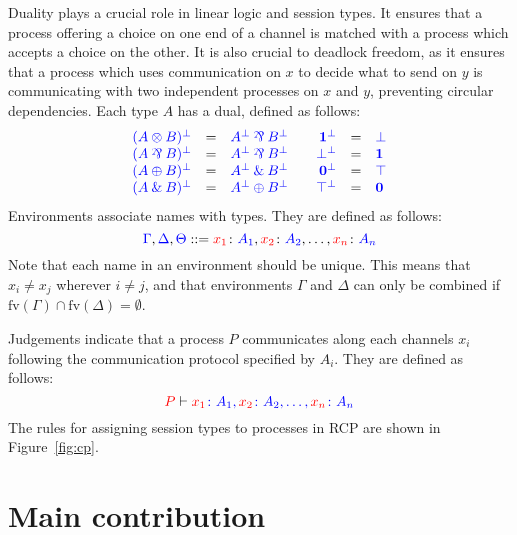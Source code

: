 \documentclass[a4paper,UKenglish]{lipics-v2016}
\begin{document}
Duality plays a crucial role in linear logic and session types. It ensures that
a process offering a choice on one end of a channel is matched with a process
which accepts a choice on the other. It is also crucial to deadlock freedom, as
it ensures that a process which uses communication on $x$ to decide what to send
on $y$ is communicating with two independent processes on $x$ and $y$,
preventing circular dependencies. Each type $A$ has a dual, defined as follows:
\[
  \begin{array}{rclcrcl}
    \tm{( A \tens B )^\bot} &=& \tm{A^\bot \parr B^\bot}&&
    \tm{\one^\bot}          &=& \tm{\bot}\\
    \tm{( A \parr B )^\bot} &=& \tm{A^\bot \parr B^\bot}&&
    \tm{\bot^\bot}          &=& \tm{\one}\\
    \tm{( A \plus B )^\bot} &=& \tm{A^\bot \with B^\bot}&&
    \tm{\nil^\bot}          &=& \tm{\top}\\
    \tm{( A \with B )^\bot} &=& \tm{A^\bot \plus B^\bot}&&
    \tm{\top^\bot}          &=& \tm{\nil}
  \end{array}
\]
Environments associate names with types. They are defined as follows:
\[
  \blue{\Gamma},\blue{\Delta},\blue{\Theta} ::=
  \tm[x_1]{A_1},\tm[x_2]{A_2},\dots,\tm[x_n]{A_n}
\]
Note that each name in an environment should be unique. This means that $x_i
\neq x_j$ wherever $i \neq j$, and that environments $\Gamma$ and $\Delta$ can
only be combined if $\text{fv}(\Gamma) \cap \text{fv}(\Delta) = \emptyset$.

Judgements indicate that a process $P$ communicates along each channels $x_i$
following the communication protocol specified by $A_i$. They are defined as
follows:
\[
  \seq[{ P }]{ \tm[x_1]{A_1},\tm[x_2]{A_2},\dots,\tm[x_n]{A_n} }
\]
The rules for assigning session types to processes in RCP are shown in
Figure~\ref{fig:cp}.




\section{Main contribution}

%
%
%
%
%
%
%
%

\clearpage

\end{document}
